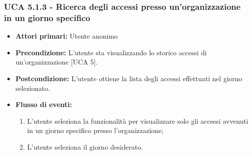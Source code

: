 \subsubsection{UCA 5.1.3 - Ricerca degli accessi presso un'organizzazione in un giorno specifico}
\begin{itemize}
	\item \textbf{Attori primari:} Utente anonimo
	\item \textbf{Precondizione:} L'utente sta visualizzando lo storico accessi di un'organizzazione [UCA 5].
	\item \textbf{Postcondizione:} L'utente ottiene la lista degli accessi effettuati nel giorno selezionato.
	\item \textbf{Flusso di eventi:}
	\begin{enumerate}
		\item L'utente seleziona la funzionalità per visualizzare solo gli accessi avvenuti in un giorno specifico presso l'organizzazione;
		\item L'utente seleziona il giorno desiderato.
	\end{enumerate}  
\end{itemize}

